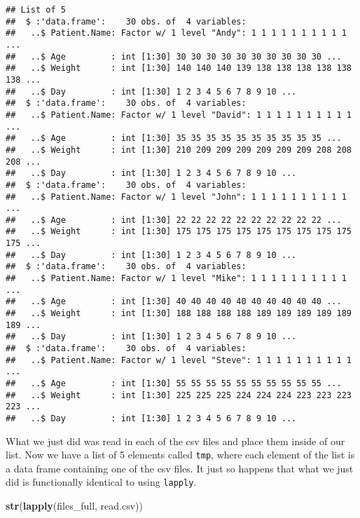 \documentclass[
]{article}
\newenvironment{Shaded}{\begin{snugshade}}{\end{snugshade}}
\newcommand{\KeywordTok}[1]{\textcolor[rgb]{0.13,0.29,0.53}{\textbf{#1}}}
\newcommand{\NormalTok}[1]{#1}
\begin{document}
\begin{verbatim}
## List of 5
##  $ :'data.frame':    30 obs. of  4 variables:
##   ..$ Patient.Name: Factor w/ 1 level "Andy": 1 1 1 1 1 1 1 1 1 1 ...
##   ..$ Age         : int [1:30] 30 30 30 30 30 30 30 30 30 30 ...
##   ..$ Weight      : int [1:30] 140 140 140 139 138 138 138 138 138 138 ...
##   ..$ Day         : int [1:30] 1 2 3 4 5 6 7 8 9 10 ...
##  $ :'data.frame':    30 obs. of  4 variables:
##   ..$ Patient.Name: Factor w/ 1 level "David": 1 1 1 1 1 1 1 1 1 1 ...
##   ..$ Age         : int [1:30] 35 35 35 35 35 35 35 35 35 35 ...
##   ..$ Weight      : int [1:30] 210 209 209 209 209 209 209 208 208 208 ...
##   ..$ Day         : int [1:30] 1 2 3 4 5 6 7 8 9 10 ...
##  $ :'data.frame':    30 obs. of  4 variables:
##   ..$ Patient.Name: Factor w/ 1 level "John": 1 1 1 1 1 1 1 1 1 1 ...
##   ..$ Age         : int [1:30] 22 22 22 22 22 22 22 22 22 22 ...
##   ..$ Weight      : int [1:30] 175 175 175 175 175 175 175 175 175 175 ...
##   ..$ Day         : int [1:30] 1 2 3 4 5 6 7 8 9 10 ...
##  $ :'data.frame':    30 obs. of  4 variables:
##   ..$ Patient.Name: Factor w/ 1 level "Mike": 1 1 1 1 1 1 1 1 1 1 ...
##   ..$ Age         : int [1:30] 40 40 40 40 40 40 40 40 40 40 ...
##   ..$ Weight      : int [1:30] 188 188 188 188 189 189 189 189 189 189 ...
##   ..$ Day         : int [1:30] 1 2 3 4 5 6 7 8 9 10 ...
##  $ :'data.frame':    30 obs. of  4 variables:
##   ..$ Patient.Name: Factor w/ 1 level "Steve": 1 1 1 1 1 1 1 1 1 1 ...
##   ..$ Age         : int [1:30] 55 55 55 55 55 55 55 55 55 55 ...
##   ..$ Weight      : int [1:30] 225 225 225 224 224 224 223 223 223 223 ...
##   ..$ Day         : int [1:30] 1 2 3 4 5 6 7 8 9 10 ...
\end{verbatim}

What we just did was read in each of the csv files and place them inside
of our list. Now we have a list of 5 elements called \texttt{tmp}, where
each element of the list is a data frame containing one of the csv
files. It just so happens that what we just did is functionally
identical to using \texttt{lapply}.

\begin{Shaded}
\begin{Highlighting}[]
\KeywordTok{str}\NormalTok{(}\KeywordTok{lapply}\NormalTok{(files_full, read.csv))}
\end{Highlighting}
\end{Shaded}
\end{document}
